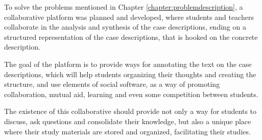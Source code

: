 To solve the problems mentioned in Chapter \ref{chapter:problemdescription}, a collaborative platform was planned and developed, where students and teachers collaborate in the analysis and synthesis of the case descriptions, ending on a structured representation of the case descriptions, that is hooked on the concrete description. 

The goal of the platform is to provide ways for annotating the text on the case descriptions, which will help students organizing their thoughts and creating the structure, and use elements of social software, as a way of promoting collaboration, mutual aid, learning and even some competition between students.
 
The existence of this collaborative should provide not only a way for students to discuss, ask questions and consolidate their knowledge, but also a unique place where their study materials are stored and organized, facilitating their studies.
